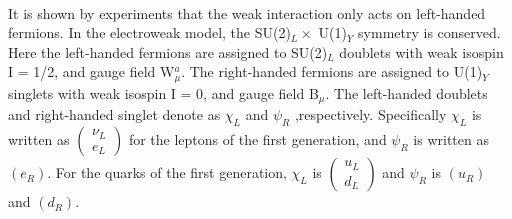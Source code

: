 \noindent\textbf{} \\
It is shown by experiments that the weak interaction only acts on left-handed fermions. In the electroweak model, the SU(2)$_L \times$ U(1)$_Y$ symmetry is conserved. Here the left-handed fermions are assigned to SU(2)$_L$ doublets with weak isospin I = 1/2, and gauge field W$^a_\mu$. The right-handed fermions are assigned to  U(1)$_Y$ singlets with weak isospin I = 0, and gauge field B$_\mu$.
The left-handed doublets and right-handed singlet denote as $\chi_{L}$ and $\psi_{R}$ ,respectively. Specifically $\chi_{L}$ is written as 
$
\left(\begin{array}{c}
\nu_{L} \\
e_{L}
\end{array}\right)
$
for the leptons of the first generation, and $\psi_{R}$ is written as $(e_R)$.
For the quarks of the first generation, $\chi_{L}$ is 
$
\left(\begin{array}{c}
u_{L} \\
d_{L}
\end{array}\right)
$
and $\psi_{R}$ is $(u_R)$ and $(d_R)$.




